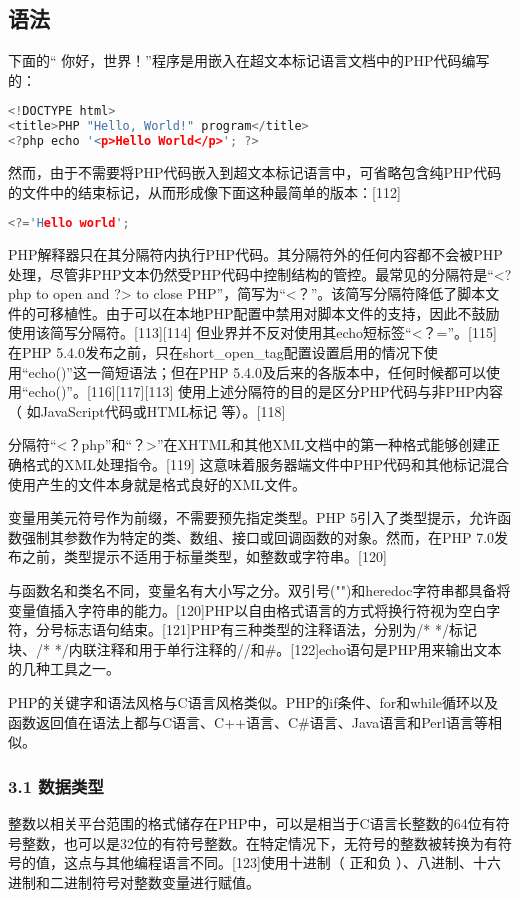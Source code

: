 \subsection{语法}
下面的“ 你好，世界！”程序是用嵌入在超文本标记语言文档中的PHP代码编写的：
\begin{lstlisting}[language=cpp]
<!DOCTYPE html>
<title>PHP "Hello, World!" program</title>
<?php echo '<p>Hello World</p>'; ?>
\end{lstlisting}
然而，由于不需要将PHP代码嵌入到超文本标记语言中，可省略包含纯PHP代码的文件中的结束标记，从而形成像下面这种最简单的版本：[112]
\begin{lstlisting}[language=cpp]
 <?='Hello world';
\end{lstlisting}
PHP解释器只在其分隔符内执行PHP代码。其分隔符外的任何内容都不会被PHP处理，尽管非PHP文本仍然受PHP代码中控制结构的管控。最常见的分隔符是“<?php to open and ?> to close PHP”，简写为“<？”。该简写分隔符降低了脚本文件的可移植性。由于可以在本地PHP配置中禁用对脚本文件的支持，因此不鼓励使用该简写分隔符。[113][114] 但业界并不反对使用其echo短标签“<？=”。[115] 在PHP 5.4.0发布之前，只在short_open_tag配置设置启用的情况下使用“echo()”这一简短语法；但在PHP 5.4.0及后来的各版本中，任何时候都可以使用“echo()”。[116][117][113] 使用上述分隔符的目的是区分PHP代码与非PHP内容（ 如JavaScript代码或HTML标记 等）。[118]

分隔符“<？php”和“？>”在XHTML和其他XML文档中的第一种格式能够创建正确格式的XML处理指令。[119] 这意味着服务器端文件中PHP代码和其他标记混合使用产生的文件本身就是格式良好的XML文件。

变量用美元符号作为前缀，不需要预先指定类型。PHP 5引入了类型提示，允许函数强制其参数作为特定的类、数组、接口或回调函数的对象。然而，在PHP 7.0发布之前，类型提示不适用于标量类型，如整数或字符串。[120]

与函数名和类名不同，变量名有大小写之分。双引号("")和heredoc字符串都具备将变量值插入字符串的能力。[120]PHP以自由格式语言的方式将换行符视为空白字符，分号标志语句结束。[121]PHP有三种类型的注释语法，分别为/* */标记块、/* */内联注释和用于单行注释的//和#。[122]echo语句是PHP用来输出文本的几种工具之一。

PHP的关键字和语法风格与C语言风格类似。PHP的if条件、for和while循环以及函数返回值在语法上都与C语言、C++语言、C#语言、Java语言和Perl语言等相似。
\subsubsection{3.1 数据类型}
整数以相关平台范围的格式储存在PHP中，可以是相当于C语言长整数的64位有符号整数，也可以是32位的有符号整数。在特定情况下，无符号的整数被转换为有符号的值，这点与其他编程语言不同。[123]使用十进制（ 正和负 ）、八进制、十六进制和二进制符号对整数变量进行赋值。

